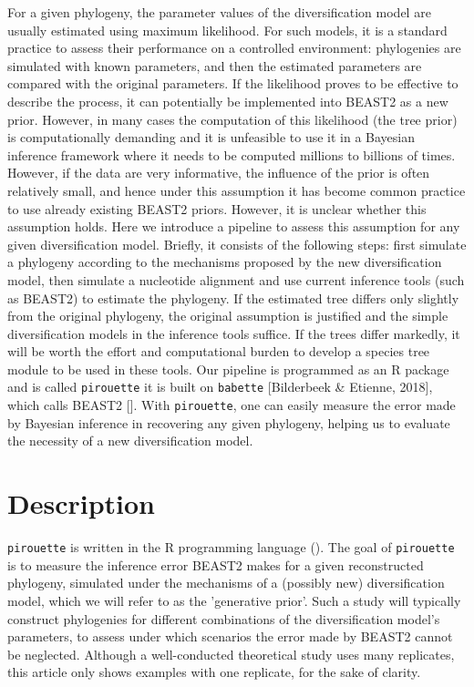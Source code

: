 \documentclass{article}
\begin{document}
For a given phylogeny, the parameter values of the diversification model 
are usually estimated using maximum likelihood.
For such  models, 
it is a standard practice to assess their performance 
on a controlled environment: 
phylogenies are simulated with known parameters, 
and then the estimated parameters are compared with the original parameters.
If the likelihood proves to be effective to describe the process, 
it can potentially be implemented into BEAST2 as a new prior. 
However, in many cases the computation of this likelihood (the tree prior) 
is computationally demanding and it is unfeasible to use it 
in a Bayesian inference framework where it needs to be 
computed millions to billions of times.
However, if the data are very informative, the influence of the prior 
is often relatively small, and hence under this assumption 
it has become common practice to use already existing BEAST2 priors. 
However, it is unclear whether this assumption holds.
Here we introduce a pipeline to assess this assumption 
for any given diversification model. 
Briefly, it consists of the following steps: 
first simulate a phylogeny 
according to the mechanisms proposed by the new diversification model, 
then simulate a nucleotide alignment 
and use current inference tools (such as BEAST2) to estimate the phylogeny. 
If the estimated tree differs only slightly from the original phylogeny, 
the original assumption is justified and the simple diversification models 
in the inference tools suffice. 
If the trees differ markedly, it will be worth the effort and computational burden 
to develop a species tree module to be used in these tools.
Our pipeline is programmed as an R package and is called 
\verb;pirouette; it is built on \verb;babette; [Bilderbeek \& Etienne, 2018], 
which calls BEAST2 [\cite{bouckaert2014beast}]. 
With \verb;pirouette;, one
can easily measure the error made by Bayesian inference in recovering
any given phylogeny, helping us to evaluate the necessity of a new diversification model.

\section{Description}

\verb;pirouette; is written in the R programming language (\cite{R}).
The goal of \verb;pirouette; is to measure the inference error BEAST2
makes for a given reconstructed phylogeny, 
simulated under the mechanisms of a (possibly new) diversification model, 
which we will refer to as the 'generative prior'. 
Such a study will typically construct phylogenies 
for different combinations of the diversification model's parameters, 
to assess under which scenarios the error made by BEAST2 cannot be neglected. 
Although a well-conducted theoretical study uses many replicates, 
this article only shows examples with one replicate, for the sake of clarity.
\end{document}
